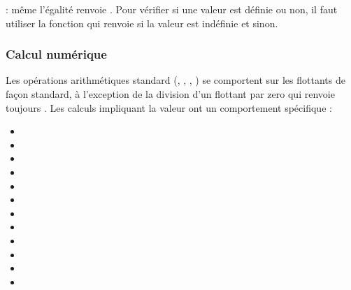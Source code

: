 \documentclass[letterpaper,10pt,french]{sphinxmanual}
\begin{document}
\sphinxAtStartPar
{}: même l’égalité  renvoie .
Pour vérifier si une valeur est définie ou non, il faut utiliser la fonction
 qui renvoie  si la valeur est indéfinie et  sinon.


\subsubsection{Calcul numérique}
\label{\detokenize{syntax:calcul-numerique}}
\sphinxAtStartPar
Les opérations arithmétiques standard (\sphinxcode{\sphinxupquote{+}}, \sphinxcode{\sphinxupquote{\sphinxhyphen{}}}, \sphinxcode{\sphinxupquote{*}}, \sphinxcode{\sphinxupquote{/}}) se comportent sur
les flottants de façon standard, à l’exception de la division d’un flottant par
zero qui renvoie toujours .
Les calculs impliquant la valeur  ont un comportement spécifique :
\begin{itemize}
\item {} 
\sphinxAtStartPar
{}

\item {} 
\sphinxAtStartPar
{}

\item {} 
\sphinxAtStartPar
{}

\item {} 
\sphinxAtStartPar
{}

\item {} 
\sphinxAtStartPar
{}

\item {} 
\sphinxAtStartPar
{}

\item {} 
\sphinxAtStartPar
{}

\item {} 
\sphinxAtStartPar
{}

\item {} 
\sphinxAtStartPar
{}

\item {} 
\sphinxAtStartPar
{}

\item {} 
\sphinxAtStartPar
{}

\item {} 
\sphinxAtStartPar
{}

\end{itemize}
\end{document}
